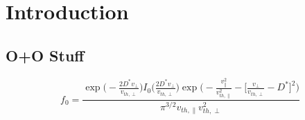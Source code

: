 \chapter{Introduction}

\section{O+O Stuff}

\begin{equation}
	f_0 = \frac{
	\exp\bigg( - \frac{2 D^* v_\perp}{v_{th,\perp}} \bigg) I_0 \bigg(  \frac{2 D^* v_\perp}{v_{th,\perp}} \bigg)  
	\exp \bigg(  -\frac{v_\parallel^2}{v_{th,\parallel}^2} - \Big[ \frac{v_\perp}{v_{th,\perp} } - D^* \Big]^2  \bigg)}{
	\pi^{3/2} v_{th,\parallel} v_{th,\perp}^{2}}
\end{equation}


